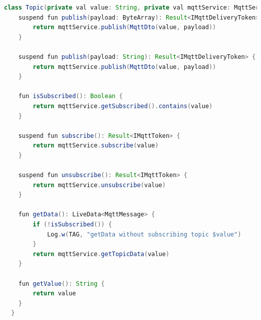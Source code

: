  \begin{lstlisting}[language=Java, caption=Klasa wewnętrzna \textit{Topic}]
  class Topic(private val value: String, private val mqttService: MqttService) {
    suspend fun publish(payload: ByteArray): Result<IMqttDeliveryToken> {
        return mqttService.publish(MqttDto(value, payload))
    }
  
    suspend fun publish(payload: String): Result<IMqttDeliveryToken> {
        return mqttService.publish(MqttDto(value, payload))
    }
  
    fun isSubscribed(): Boolean {
        return mqttService.getSubscribed().contains(value)
    }
  
    suspend fun subscribe(): Result<IMqttToken> {
        return mqttService.subscribe(value)
    }
  
    suspend fun unsubscribe(): Result<IMqttToken> {
        return mqttService.unsubscribe(value)
    }
  
    fun getData(): LiveData<MqttMessage> {
        if (!isSubscribed()) {
            Log.w(TAG, "getData without subscribing topic $value")
        }
        return mqttService.getTopicData(value)
    }
  
    fun getValue(): String {
        return value
    }
  }
  
  \end{lstlisting}



